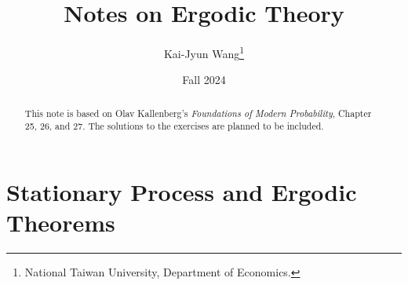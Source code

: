 \documentclass[a4paper, 12pt]{article}
\title{Notes on Ergodic Theory}
\author{Kai-Jyun Wang\thanks{National Taiwan University, Department of Economics.}}
\date{Fall 2024}
\begin{document}

\maketitle

\begin{abstract}
    This note is based on Olav Kallenberg's \textit{Foundations of 
    Modern Probability}, Chapter 25, 26, and 27. The solutions to 
    the exercises are planned to be included. 
\end{abstract}

\section{Stationary Process and Ergodic Theorems}

\end{document}
